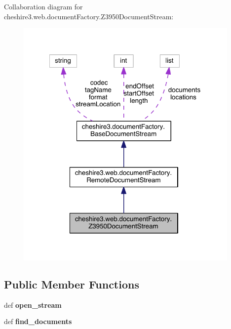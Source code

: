 Collaboration diagram for cheshire3.\-web.\-document\-Factory.\-Z3950\-Document\-Stream\-:
\nopagebreak
\begin{figure}[H]
\begin{center}
\leavevmode
\includegraphics[width=309pt]{classcheshire3_1_1web_1_1document_factory_1_1_z3950_document_stream__coll__graph}
\end{center}
\end{figure}
\subsection*{Public Member Functions}
\begin{DoxyCompactItemize}
\item 
\hypertarget{classcheshire3_1_1web_1_1document_factory_1_1_z3950_document_stream_a8d1caf1a64a9ab90f3962b2fc902c63b}{def {\bfseries open\-\_\-stream}}\label{classcheshire3_1_1web_1_1document_factory_1_1_z3950_document_stream_a8d1caf1a64a9ab90f3962b2fc902c63b}

\item 
\hypertarget{classcheshire3_1_1web_1_1document_factory_1_1_z3950_document_stream_aeb1d5d4ac470702f992b9578c1617888}{def {\bfseries find\-\_\-documents}}\label{classcheshire3_1_1web_1_1document_factory_1_1_z3950_document_stream_aeb1d5d4ac470702f992b9578c1617888}

\end{DoxyCompactItemize}
